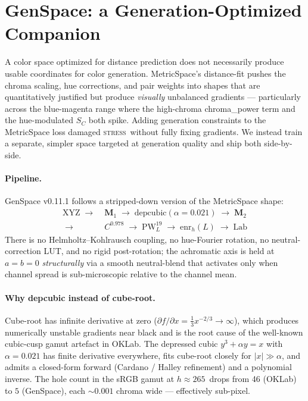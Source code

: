 \documentclass[11pt, twocolumn]{article}
\newcommand{\stress}{\textsc{stress}}
\begin{document}
\section{GenSpace: a Generation-Optimized Companion}
\label{sec:genspace}

A color space optimized for distance prediction does not necessarily
produce usable coordinates for color generation. MetricSpace's
distance-fit pushes the chroma scaling, hue corrections, and pair
weights into shapes that are quantitatively justified but produce
\emph{visually} unbalanced gradients --- particularly across the
blue-magenta range where the high-chroma chroma\_power term and the
hue-modulated $S_C$ both spike. Adding generation constraints to
the MetricSpace loss damaged \stress\ without fully fixing
gradients. We instead train a separate, simpler space targeted
at generation quality and ship both side-by-side.

\paragraph{Pipeline.}
GenSpace v0.11.1 follows a stripped-down version of the MetricSpace
shape:
\begin{equation*}
\begin{aligned}
\mathrm{XYZ} \;\to\;& \mathbf{M}_1 \;\to\; \mathrm{depcubic}(\alpha\!=\!0.021) \;\to\; \mathbf{M}_2 \\
\;\to\;& C^{0.978} \;\to\; \mathrm{PW}_L^{19} \;\to\; \mathrm{enr}_h(L) \;\to\; \mathrm{Lab}
\end{aligned}
\end{equation*}
There is no Helmholtz--Kohlrausch coupling, no hue-Fourier rotation,
no neutral-correction LUT, and no rigid post-rotation; the
achromatic axis is held at $a=b=0$ \emph{structurally} via a smooth
neutral-blend that activates only when channel spread is
sub-microscopic relative to the channel mean.

\paragraph{Why depcubic instead of cube-root.}
Cube-root has infinite derivative at zero ($\partial f/\partial x = \tfrac{1}{3}x^{-2/3}\to\infty$),
which produces numerically unstable gradients near black and is the
root cause of the well-known cubic-cusp gamut artefact in OKLab.
The depressed cubic $y^3 + \alpha y = x$ with $\alpha=0.021$ has
finite derivative everywhere, fits cube-root closely for
$|x| \gg \alpha$, and admits a closed-form forward (Cardano /
Halley refinement) and a polynomial inverse. The hole count in the
sRGB gamut at $h\!\approx\!265$\textdegree\ drops from 46 (OKLab) to
$5$ (GenSpace), each $\sim 0.001$ chroma wide --- effectively
sub-pixel.
\end{document}
